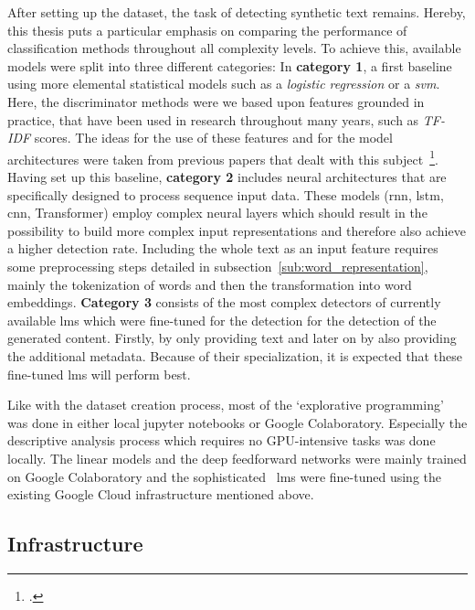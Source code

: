 After setting up the dataset, the task of detecting synthetic text remains. Hereby, this thesis puts a particular emphasis on comparing the performance of classification methods throughout all complexity levels. To achieve this, available models were split into three different categories: In \textbf{category 1}, a first baseline using more elemental statistical models such as a \textit{logistic regression} or a \textit{\gls{svm}}. Here, the discriminator methods were we based upon features grounded in practice, that have been used in research throughout many years, such as \textit{TF-IDF} scores. The ideas for the use of these features and for the model architectures were taken from previous papers that dealt with this subject~\footcite{lavergne2008detecting,beresneva2016computer}. Having set up this baseline, \textbf{category 2} includes neural architectures that are specifically designed to process sequence input data. These models (\gls{rnn}, \gls{lstm}, \gls{cnn}, Transformer) employ complex neural layers which should result in the possibility to build more complex input representations and therefore also achieve a higher detection rate. Including the whole text as an input feature requires some preprocessing steps detailed in subsection~\ref{sub:word_representation}, mainly the tokenization of words and then the transformation into word embeddings. \textbf{Category 3} consists of the most complex detectors of currently available \gls{lm}s which were fine-tuned for the detection for the detection of the generated content. Firstly, by only providing text and later on by also providing the additional metadata. Because of their specialization, it is expected that these fine-tuned \gls{lm}s will perform best.

Like with the dataset creation process, most of the `explorative programming' was done in either local jupyter notebooks or Google Colaboratory. Especially the descriptive analysis process which requires no GPU-intensive tasks was done locally. The linear models and the deep feedforward networks were mainly trained on Google Colaboratory and the sophisticated ~\gls{lm}s were fine-tuned using the existing Google Cloud infrastructure mentioned above.

\subsection{Infrastructure}
\label{sec:infrastructure}

